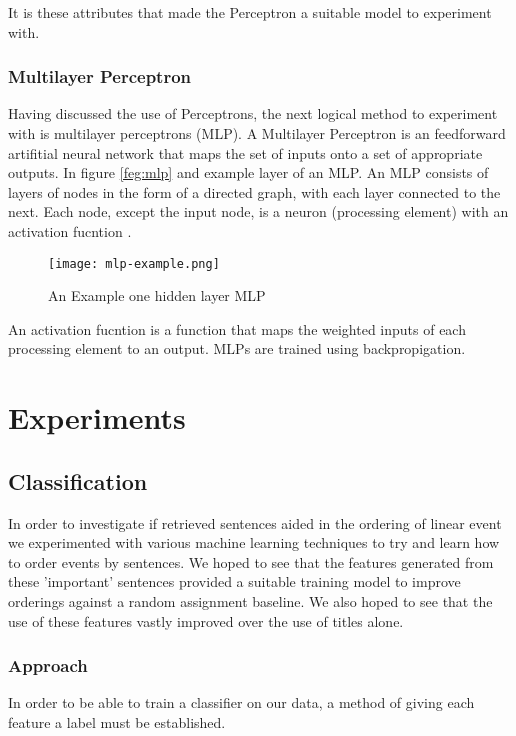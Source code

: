 \documentclass[bsc,frontabs,twoside,singlespacing,parskip,deptreport]{infthesis}     %
\begin{document}
It is these attributes that made the Perceptron a suitable model to experiment with.
\subsection{Multilayer Perceptron}
Having discussed the use of Perceptrons, the next logical method to experiment with is multilayer perceptrons (MLP).
A Multilayer Perceptron is an feedforward artifitial neural network that maps the set of inputs
onto a set of appropriate outputs.
In figure \ref{feg:mlp} and example layer of an MLP.
An MLP consists of layers of  nodes in the form of a directed graph, with each layer connected to the next.
Each node, except the input node, is a neuron (processing element) with an activation fucntion \cite{}.%

\begin{figure}
  \centering
  \texttt{[image: mlp-example.png]}
  \caption{An Example one hidden layer MLP \cite{scikit-learn}}
  \label{fig:mlp}
\end{figure}

An activation fucntion is a function that maps the weighted inputs of each processing element to an output.
MLPs are trained using backpropigation.


\chapter{Experiments}
\section{Classification}
In order to investigate if retrieved sentences aided in the  ordering of linear event we experimented with various
machine learning techniques to try and learn how to order events by sentences.
We hoped to see that the features generated from these 'important' sentences provided a suitable training model
to improve orderings against a random assignment baseline. We also hoped to see that the use of these features vastly
improved over the use of titles alone.


\subsection{Approach}
In order to be able to train a classifier on our data, a method of giving each feature a label must be established.
\end{document}
